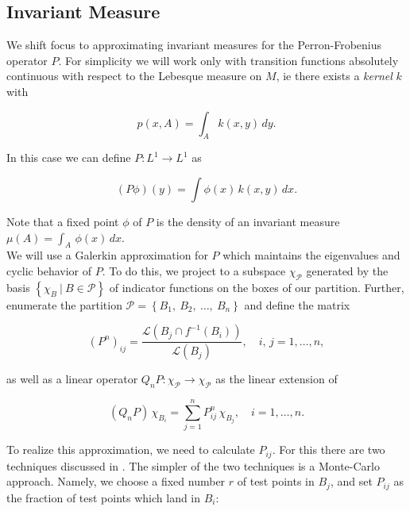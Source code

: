 
\subsection{Invariant Measure}

We shift focus to approximating invariant measures for the Perron-Frobenius operator $P$.
For simplicity we will work only with transition functions absolutely continuous with 
respect to the Lebesque measure on $M$, ie there exists a \emph{kernel} $k$ with 

\begin{equation}
    \label{eq:kernel}
    p(x, A) = \int_A k(x, y)\, dy.
\end{equation}

In this case we can define $P: L^1 \to L^1$ as 

\begin{equation}
    (P \phi)(y) = \int \phi (x)\, k(x, y)\, dx.
\end{equation}

Note that a fixed point $\phi$ of $P$ is the density of an invariant measure 
$\mu (A) = \int_A\, \phi(x)\, dx$. \\

We will use a Galerkin approximation for $P$ which maintains the eigenvalues and cyclic 
behavior of $P$. To do this, we project to a subspace 
$\chi_{\mathcal{P}}$ generated by the basis $\left\{ \chi_B\ \vert\ B \in \mathcal{P} \right\}$ 
of indicator functions on the boxes of our partition. Further, enumerate the partition 
$\mathcal{P} = \left\{ B_1,\ B_2,\ \ldots,\ B_n \right\}$ and define the matrix 

\begin{equation}
    \label{eq:pij}
    (P^n)_{ij} = \frac{\mathcal{L}\left(B_j \cap f^{-1}(B_i)\right)}{\mathcal{L}(B_j)}, 
    \quad i,\, j = 1, \ldots, n,
\end{equation}

as well as a linear operator $Q_n P : \chi_{\mathcal{P}} \to \chi_{\mathcal{P}}$ as 
the linear extension of 

\begin{equation}
    \label{eq:qnp}
    (Q_n P)\, \chi_{B_i} = \sum_{j = 1}^n P_{ij}^n\, \chi_{B_j}, \quad i = 1, \ldots, n.
\end{equation}

To realize this approximation, we need to calculate $P_{ij}$. For this there are two 
techniques discussed in \cite*{algGAIO}. The simpler of the two techniques is a 
Monte-Carlo approach. Namely, we choose a fixed number $r$ of test points in 
$B_j$, and set $P_{ij}$ as the fraction of test points which land in $B_i$:

